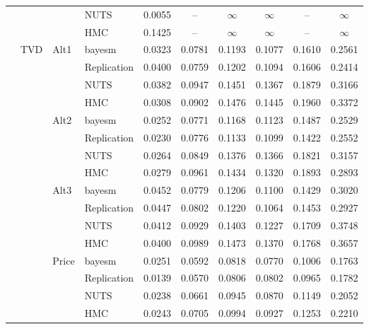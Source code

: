 \begin{longtable}{clllcccccc}
 &  &  & NUTS & 0.0055 & {--} & $\infty$ & $\infty$ & {--} & $\infty$ \\
 &  &  & HMC & 0.1425 & {--} & $\infty$ & $\infty$ & {--} & $\infty$ \\
 & TVD & Alt1 & bayesm & 0.0323 & 0.0781 & 0.1193 & 0.1077 & 0.1610 & 0.2561 \\
 &  &  & Replication & 0.0400 & 0.0759 & 0.1202 & 0.1094 & 0.1606 & 0.2414 \\
 &  &  & NUTS & 0.0382 & 0.0947 & 0.1451 & 0.1367 & 0.1879 & 0.3166 \\
 &  &  & HMC & 0.0308 & 0.0902 & 0.1476 & 0.1445 & 0.1960 & 0.3372 \\
 &  & Alt2 & bayesm & 0.0252 & 0.0771 & 0.1168 & 0.1123 & 0.1487 & 0.2529 \\
 &  &  & Replication & 0.0230 & 0.0776 & 0.1133 & 0.1099 & 0.1422 & 0.2552 \\
 &  &  & NUTS & 0.0264 & 0.0849 & 0.1376 & 0.1366 & 0.1821 & 0.3157 \\
 &  &  & HMC & 0.0279 & 0.0961 & 0.1434 & 0.1320 & 0.1893 & 0.2893 \\
 &  & Alt3 & bayesm & 0.0452 & 0.0779 & 0.1206 & 0.1100 & 0.1429 & 0.3020 \\
 &  &  & Replication & 0.0447 & 0.0802 & 0.1220 & 0.1064 & 0.1453 & 0.2927 \\
 &  &  & NUTS & 0.0412 & 0.0929 & 0.1403 & 0.1227 & 0.1709 & 0.3748 \\
 &  &  & HMC & 0.0400 & 0.0989 & 0.1473 & 0.1370 & 0.1768 & 0.3657 \\
 &  & Price & bayesm & 0.0251 & 0.0592 & 0.0818 & 0.0770 & 0.1006 & 0.1763 \\
 &  &  & Replication & 0.0139 & 0.0570 & 0.0806 & 0.0802 & 0.0965 & 0.1782 \\
 &  &  & NUTS & 0.0238 & 0.0661 & 0.0945 & 0.0870 & 0.1149 & 0.2052 \\
 &  &  & HMC & 0.0243 & 0.0705 & 0.0994 & 0.0927 & 0.1253 & 0.2210 \\
\end{longtable}
